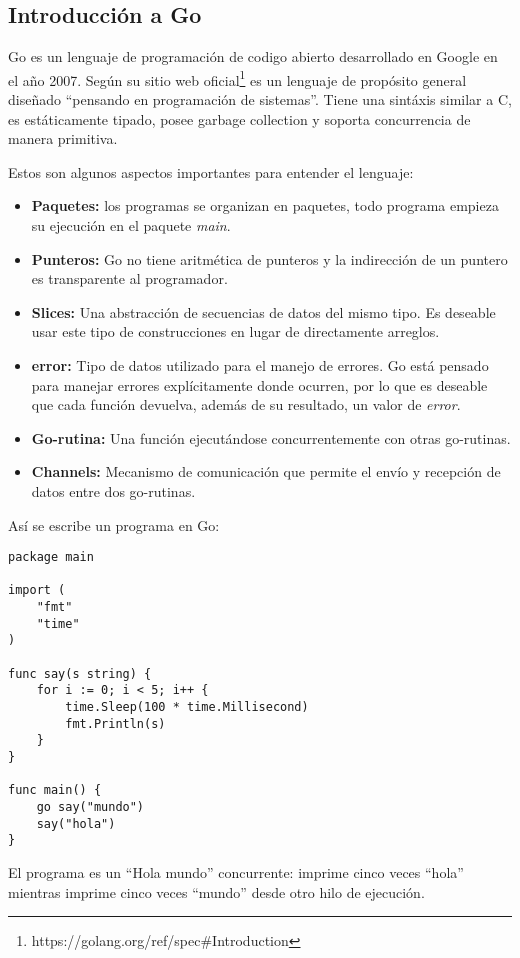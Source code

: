 \subsection{Introducción a Go}
Go es un lenguaje de programación de codigo abierto desarrollado en Google en el año 2007. Según su sitio web oficial\footnote{https://golang.org/ref/spec\#Introduction} es un lenguaje de propósito general diseñado ``pensando en programación de sistemas''. Tiene una sintáxis similar a C, es estáticamente tipado, posee garbage collection y soporta concurrencia de manera primitiva.

Estos son algunos aspectos importantes para entender el lenguaje:

\begin{itemize}
 \item \textbf{Paquetes:} los programas se organizan en paquetes, todo programa empieza su ejecución en el paquete \textit{main}.
 \item \textbf{Punteros:} Go no tiene aritmética de punteros y la indirección de un puntero es transparente al programador.
 \item \textbf{Slices:} Una abstracción de secuencias de datos del mismo tipo. Es deseable usar este tipo de construcciones en lugar de directamente arreglos.
 \item \textbf{error:} Tipo de datos utilizado para el manejo de errores. Go está pensado para manejar errores explícitamente donde ocurren, por lo que es deseable que cada función devuelva, además de su resultado, un valor de \textit{error}.
 \item \textbf{Go-rutina:} Una función ejecutándose concurrentemente con otras go-rutinas.
 \item \textbf{Channels:} Mecanismo de comunicación que permite el envío y recepción de datos entre dos go-rutinas.
\end{itemize}

Así se escribe un programa en Go:

\begin{verbatim}
package main

import (
    "fmt"
    "time"
)

func say(s string) {
    for i := 0; i < 5; i++ {
        time.Sleep(100 * time.Millisecond)
        fmt.Println(s)
    }
}

func main() {
    go say("mundo")
    say("hola")
}
\end{verbatim}

El programa es un ``Hola mundo'' concurrente: imprime cinco veces ``hola'' mientras imprime cinco veces ``mundo'' desde otro hilo de ejecución.

